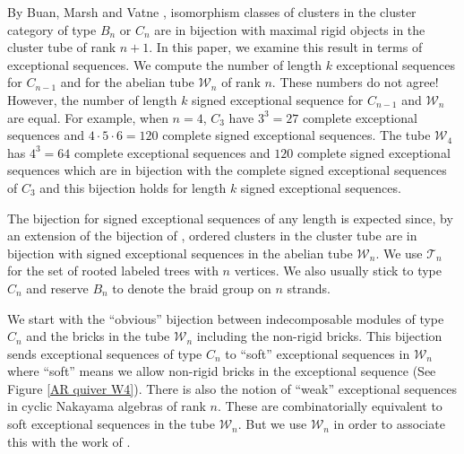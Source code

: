 \documentclass[11pt]{amsart}
\theoremstyle{definition}
\theoremstyle{remark}
\numberwithin{equation}{section}
\newcommand{\cT}{\ensuremath{{\mathcal{T}}}}
\newcommand{\cW}{\ensuremath{{\mathcal{W}}}}
\begin{document}
By Buan, Marsh and Vatne \cite{BMV}, isomorphism classes of clusters in the cluster category of type $B_n$ or $C_n$ are in bijection with maximal rigid objects in the cluster tube of rank $n+1$. In this paper, we examine this result in terms of exceptional sequences. We compute the number of length $k$ exceptional sequences for $C_{n-1}$ and for the abelian tube $\cW_n$ of rank $n$. These numbers do not agree! However, the number of length $k$ signed exceptional sequence for $C_{n-1}$ and $\cW_n$ are equal. For example, when $n=4$, $C_3$ have $3^3=27$ complete exceptional sequences and $4\cdot 5\cdot 6=120$ complete signed exceptional sequences. The tube $\cW_4$ has $4^3=64$ complete exceptional sequences and $120$ complete signed exceptional sequences which are in bijection with the complete signed exceptional sequences of $C_3$ and this bijection holds for length $k$ signed exceptional sequences.


The bijection for signed exceptional sequences of any length is expected since, by an extension of the bijection of \cite{IT13}, ordered clusters in the cluster tube are in bijection with signed exceptional sequences in the abelian tube $\cW_n$. We use $\cT_n$ for the set of rooted labeled trees with $n$ vertices. We also usually stick to type $C_n$ and reserve $B_n$ to denote the braid group on $n$ strands.




We start with the ``obvious'' bijection between indecomposable modules of type $C_n$ and the bricks in the tube $\cW_n$ including the non-rigid bricks. This bijection sends exceptional sequences of type $C_n$ to ``soft'' exceptional sequences in $\cW_n$ where ``soft'' means we allow non-rigid bricks in the exceptional sequence (See Figure \ref{AR quiver W4}). There is also the notion of ``weak'' exceptional sequences \cite{Sen2} in cyclic Nakayama algebras of rank $n$. These are combinatorially equivalent to soft exceptional sequences in the tube $\cW_n$. But we use $\cW_n$ in order to associate this with the work of \cite{BMV}.
\end{document}
